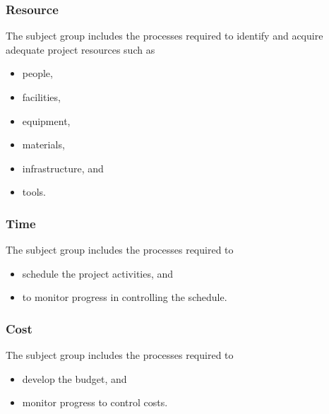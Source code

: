 \documentclass[letterpaper,10pt,english]{jupyterBook}
\begin{document}
\subsubsection{Resource}
\label{\detokenize{PM/pm-processes:resource}}
\sphinxAtStartPar
The  subject group includes the processes required to identify and acquire adequate project resources such as
\begin{itemize}
\item {} 
\sphinxAtStartPar
people,

\item {} 
\sphinxAtStartPar
facilities,

\item {} 
\sphinxAtStartPar
equipment,

\item {} 
\sphinxAtStartPar
materials,

\item {} 
\sphinxAtStartPar
infrastructure, and

\item {} 
\sphinxAtStartPar
tools.

\end{itemize}


\subsubsection{Time}
\label{\detokenize{PM/pm-processes:time}}
\sphinxAtStartPar
The  subject group includes the processes required to
\begin{itemize}
\item {} 
\sphinxAtStartPar
schedule the project activities, and

\item {} 
\sphinxAtStartPar
to monitor progress in controlling the schedule.

\end{itemize}


\subsubsection{Cost}
\label{\detokenize{PM/pm-processes:cost}}
\sphinxAtStartPar
The  subject group includes the processes required to
\begin{itemize}
\item {} 
\sphinxAtStartPar
develop the budget, and

\item {} 
\sphinxAtStartPar
monitor progress to control costs.

\end{itemize}
\end{document}
